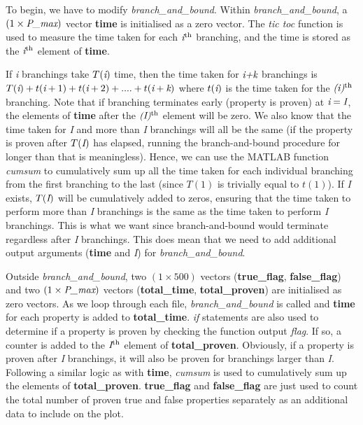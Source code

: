 \documentclass[11pt]{article}
\begin{document}
To begin, we have to modify \emph{branch\_and\_bound}. Within \emph{branch\_and\_bound}, a $(1\times\emph{P\_max})$ vector \textbf{time} is initialised as a zero vector. The \emph{tic toc} function is used to measure the time taken for each  $\emph{i}\textsuperscript{th}$ branching, and the time is stored as the $\emph{i}\textsuperscript{th}$ element of \textbf{time}. 

If \emph{i} branchings take $T(\emph{i})$ time, then the time taken for $\emph{i+k}$ branchings is $T(\emph{i}) + t(\emph{i}+1) + t(\emph{i}+2) + .... + t(\emph{i}+\emph{k})$ where $t(\emph{i})$ is the time taken for the $\emph{(i)}\textsuperscript{th}$ branching. Note that if branching terminates early (property is proven) at $\emph{i}=\emph{I}$, the elements of \textbf{time} after the $\emph{(I)}\textsuperscript{th}$ element  will be zero. We also know that the time taken for \emph{I} and more than \emph{I} branchings will all be the same (if the property is proven after $T(\emph{I})$ has elapsed, running the branch-and-bound procedure for longer than that is meaningless). Hence, we can use the MATLAB function \emph{cumsum} to cumulatively sum up all the time taken for each individual branching from the first branching to the last (since $T(1)$ is trivially equal to $t(1)$). If \emph{I} exists, $T(\emph{I})$ will be cumulatively added to zeros, ensuring that the time taken to perform more than \emph{I} branchings is the same as the time taken to perform \emph{I} branchings. This is what we want since branch-and-bound would terminate regardless after \emph{I} branchings. This does mean that we need to add additional output arguments (\textbf{time} and \emph{I}) for \emph{branch\_and\_bound}. 

Outside \emph{branch\_and\_bound}, two $(1\times500)$ vectors (\textbf{true\_flag}, \textbf{false\_flag}) and two $(1\times\emph{P\_max})$ vectors (\textbf{total\_time}, \textbf{total\_proven}) are initialised as zero vectors. As we loop through each file, \emph{branch\_and\_bound} is called and \textbf{time} for each property is added to \textbf{total\_time}. \emph{if} statements are also used to determine if a property is proven by checking the function output \emph{flag}. If so, a counter is added to the $\emph{I}\textsuperscript{th}$ element of \textbf{total\_proven}. Obviously, if a property is proven after \emph{I} branchings, it will also be proven for branchings larger than \emph{I}. Following a similar logic as with \textbf{time}, \emph{cumsum} is used to cumulatively sum up the elements of \textbf{total\_proven}. \textbf{true\_flag} and \textbf{false\_flag} are just used to count the total number of proven true and false properties separately as an additional data to include on the plot.
\end{document}
